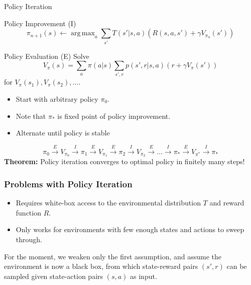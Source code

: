 \documentclass[10pt,a4paper, handout]{beamer}
\DeclareMathOperator*{\argmax}{arg\,max}
\newcommand{\iter}{\xrightarrow{I}}
\newcommand{\eval}{\xrightarrow{E}}
\begin{document}
\begin{frame}{Policy Iteration}

\begin{block}{Policy Improvement (I)}
	$$
	\pi_{n+1}(s) \leftarrow \argmax_a \sum_{s'} T(s' | s,a) 
	\left( R(s,a,s') + \gamma V_{\pi_n}(s') \right)
	$$
\end{block}

	\begin{block}{Policy Evaluation (E)}
	Solve
	$$
	V_\pi(s) = \sum_{a} \pi(a | s) \sum_{s', r} p(s', r | s, a) \left( r + \gamma V_\pi(s') \right) 
	$$ for $V_\pi(s_1), V_\pi(s_2), \ldots$.
\end{block}

\pause
\begin{itemize}
	\item Start with arbitrary policy $\pi_0$.
	\pause
	\item Note that $\pi_*$ is fixed point of policy improvement.
	\pause
	\item Alternate until policy is stable
\end{itemize}
\pause
$$
\pi_0 \eval V_{\pi_0} \iter \pi_1 \eval V_{\pi_1} \eval \pi_2 \iter V_{\pi_2}
\eval \ldots \iter \pi_* \eval V_{\pi^*} \iter \pi_* 
$$
\pause
\textbf{Theorem:} Policy iteration converges to optimal policy in finitely 
many steps!
\end{frame}


	
\begin{frame}
\frametitle{Problems with Policy Iteration}

\begin{itemize}
	\item Requires white-box access to the environmental distribution $T$
	and reward function $R$.
	\item Only works for environments with few enough states and actions
	to sweep through.
\end{itemize}
	\pause
For the moment, we weaken only the first assumption, and assume the environment
is now a black box, from which state-reward pairs $(s',r)$ can be sampled
given state-action pairs $(s,a)$ as input.

\end{frame}
\end{document}
